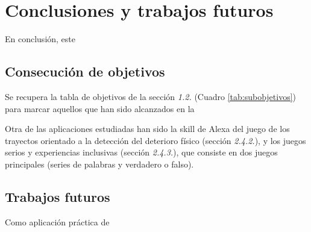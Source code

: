 \section{Conclusiones y trabajos futuros}

En conclusión, este

\subsection{Consecución de objetivos}

Se recupera la tabla de objetivos de la sección \textit{1.2.} (Cuadro \ref{tab:subobjetivos}) para marcar aquellos que han sido alcanzados en la 

Otra de las aplicaciones estudiadas han sido la skill de Alexa del juego de los trayectos orientado a la detección del deterioro físico (sección \textit{2.4.2.}), y los juegos serios y experiencias inclusivas (sección \textit{2.4.3.}), que consiste en dos juegos principales (series de palabras y verdadero o falso).

\subsection{Trabajos futuros}

Como aplicación práctica de

